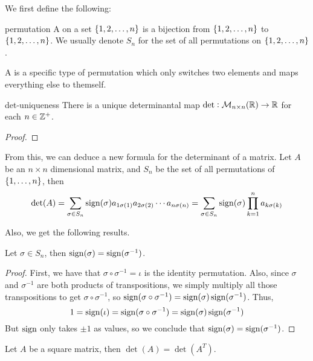 \documentclass{styles/tufte}
\begin{document}
  We first define the following:
  \begin{definition}{}{permutation}
    A  on a set $\set{1, 2, \dots, n}$ is a bijection from $\set{1, 2, \dots, n}$ to $\set{1, 2, \dots, n}$. We usually denote $S_n$ for the set of all permutations on $\set{1, 2, \dots, n}$.
    
    A  is a specific type of permutation which only switches two elements and maps everything else to themself.
  \end{definition}
  
  \begin{theorem}{}{det-uniqueness}
    There is a unique determinantal map $\det: \mathcal{M}_{n\times n}(\mathbb{R}) \to \mathbb{R}$ for each $n \in \mathbb{Z}^+$.
  \end{theorem}
  
  \begin{proof}
    
  \end{proof}
  
  From this, we can deduce a new formula for the determinant of a matrix. Let $A$ be an $n \times n$ dimensional matrix, and $S_n$ be the set of all permutations of $\set{1, \dots, n}$, then
  \begin{equation}
    \det(A) = \sum_{\sigma \in S_n} \operatorname{sign}(\sigma) a_{1\sigma(1)} a_{2\sigma(2)} \cdots a_{n\sigma(n)} = \sum_{\sigma \in S_n} \operatorname{sign}(\sigma) \prod_{k=1}^n a_{k\sigma(k)}
  \end{equation}
  
  Also, we get the following results.
  
  \begin{lemma}{}{}
    Let $\sigma \in S_n$, then $\operatorname{sign}(\sigma) = \operatorname{sign}(\sigma^{-1})$.
  \end{lemma}
  
  \begin{proof}
    First, we have that $\sigma \circ \sigma^{-1} = \iota$ is the identity permutation. Also, since $\sigma$ and $\sigma^{-1}$ are both products of transpositions, we simply multiply all those transpositions to get $\sigma \circ \sigma^{-1}$, so $\operatorname{sign}(\sigma \circ \sigma^{-1}) = \operatorname{sign}(\sigma) \operatorname{sign}(\sigma^{-1})$. Thus,
    \[ 1 = \operatorname{sign}(\iota) = \operatorname{sign}(\sigma \circ \sigma^{-1}) = \operatorname{sign}(\sigma) \operatorname{sign}(\sigma^{-1}) \]
    But $\operatorname{sign}$ only takes $\pm 1$ as values, so we conclude that $\operatorname{sign}(\sigma) = \operatorname{sign}(\sigma^{-1})$.
  \end{proof}
  
  \begin{proposition}{}{}
    Let $A$ be a square matrix, then $\det(A) = \det(A^T)$.
  \end{proposition}
  
\end{document}
